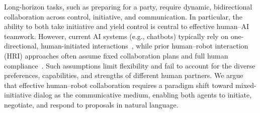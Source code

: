 
Long-horizon tasks, such as preparing for a party, require dynamic, bidirectional collaboration across control, initiative, and communication. In particular, the ability to both take initiative and yield control is central to effective human–AI teamwork. However, current AI systems (e.g., chatbots) typically rely on one-directional, human-initiated interactions~\cite{ouyang2022training, achiam2023gpt}, while prior human–robot interaction (HRI) approaches often assume fixed collaboration plans and full human compliance~\cite{selvaggio2021autonomy}. Such assumptions limit flexibility and fail to account for the diverse preferences, capabilities, and strengths of different human partners. We argue that effective human–robot collaboration requires a paradigm shift toward mixed-initiative dialog as the communicative medium, enabling both agents to initiate, negotiate, and respond to proposals in natural language.


